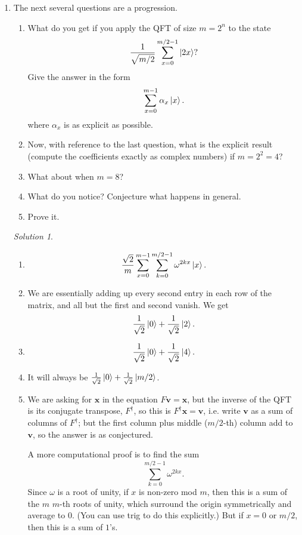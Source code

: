 \documentclass{article}
\theoremstyle{plain}
\theoremstyle{definition}
\theoremstyle{remark}
\newtheorem*{solution}{Solution}
\numberwithin{theorem}{section}
\begin{document}
  \begin{enumerate}

			\item The next several questions are a progression.

		\begin{enumerate}
			\item What do you get if you apply the QFT of size $m = 2^n$ to the state
				\[
					\frac{1}{\sqrt{m/2}}	\sum_{x=0}^{m/2-1} \ket{2x}?
				\]
			      Give the answer in the form
				\[
					\sum_{x=0}^{m-1} \alpha_x \ket{x}.
				\]
				where $\alpha_x$ is as explicit as possible.
			\item Now, with reference to the last question, what is the explicit result (compute the coefficients exactly as complex numbers) if $m = 2^2 = 4$?
			\item What about when $m=8$?
			\item What do you notice?  Conjecture what happens in general.
			\item Prove it.
		\end{enumerate}

		\begin{solution}

		\begin{enumerate}
			\item \[
					\frac{\sqrt{2}}{m} \sum_{x=0}^{m-1} \sum_{k=0}^{m/2-1} \omega^{2kx} \ket{x}.
				\]
			\item We are essentially adding up every second entry in each row of the matrix, and all but the first and second vanish.  We get
				\[
					\frac{1}{\sqrt{2}}\ket{0} + \frac{1}{\sqrt{2}}\ket{2} .
				\]
			\item 
				\[
					\frac{1}{\sqrt{2}}\ket{0} + \frac{1}{\sqrt{2}}\ket{4} .
				\]

			\item It will always be $\frac{1}{\sqrt{2}}\ket{0} + \frac{1}{\sqrt{2}}\ket{m/2}$.
			\item We are asking for $\mathbf{x}$ in the equation $F\mathbf{v} = \mathbf{x}$, but the inverse of the QFT is its conjugate transpose, $F^\dagger$, so this is $F^{\dagger} \mathbf{x} = \mathbf{v}$, i.e. write $\mathbf{v}$ as a sum of columns of $F^{\dagger}$; but the first column plus middle ($m/2$-th) column add to $\mathbf{v}$, so the answer is as conjectured.

				A more computational proof is to find the sum
				\[
					\sum_{k=0}^{m/2-1} \omega^{2kx}.
				\]
				Since $\omega$ is a root of unity, if $x$ is non-zero mod $m$, then this is a sum of the $m$ $m$-th roots of unity, which surround the origin symmetrically and average to $0$.  (You can use trig to do this explicitly.)  But if $x=0$ or $m/2$, then this is a sum of $1$'s.
		\end{enumerate}
		\end{solution}


\end{enumerate}
\end{document}
